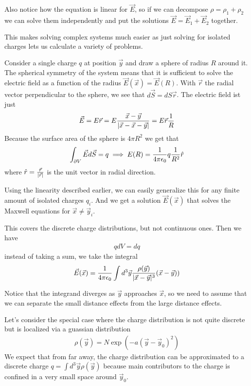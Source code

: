 Also notice how the equation is linear for $\vec{E}$, so if we can decompose $\rho = \rho_1 + \rho_2$ we can solve them independently and put the solutions $\vec{E} = \vec{E}_1 + \vec{E}_2$ together.

This makes solving complex systems much easier as just solving for isolated charges lets us calculate a variety of problems.

Consider a single charge $q$ at position $\vec{y}$ and draw a sphere of radius $R$ around it. The spherical symmetry of the system means that it is sufficient to solve the electric field as a function of the radius $\vec{E}(\vec{x}) = \vec{E}(R)$.
With $\vec{r}$ the radial vector perpendicular to the sphere, we see that $d \vec{S}= d S \vec{r}$. 
The electric field ist just
\begin{align*}
  \vec{E} = E \vec{r} = E \frac{\vec{x} - \vec{y}}{\vert\vec{x} - \vec{x} - \vec{y}\vert} = E \vec{r} \frac{1}{R}
\end{align*}
Because the surface area of the sphere is $4 \pi R^{2}$ we get that
\begin{align*}
  \int_{\partial V}\vec{E} d \vec{S} = q \implies E(R) = \frac{1}{4 \pi \epsilon_0} q \frac{1}{R^{2}} \hat{r}
\end{align*}
where $\hat{r} = \frac{\vec{r}}{\vert\vec{r}\vert}$ is the unit vector in radial direction.

Using the linearity described earlier, we can easily generalize this for any finite amount of isolated charges $q_i$.
And we get a solution $\vec{E}(\vec{x})$ that solves the Maxwell equations for $\vec{x} \neq \vec{y}_i$.

This covers the discrete charge distributions, but not continuous ones. Then we have
\begin{align*}
  q dV = dq
\end{align*}
instead of taking a sum, we take the integral
\begin{align*}
  \vec{E}(\vec{x}) = \frac{1}{4 \pi \epsilon_0} \int d^{3}\vec{y} \frac{\rho(\vec{y})}{\vert\vec{x} - \vec{y}\vert^{3}} (\vec{x} - \vec{y}))
\end{align*}

Notice that the integrand diverges as $\vec{y}$ approaches $\vec{x}$, so we need to assume that we can separate the small distance effects from the large distance effects.

Let's consider the special case where the charge distribution is not quite discrete but is localized via a guassian distribution
\begin{align*}
  \rho(\vec{y}) =N \exp\left(
    - a (\vec{y} - \vec{y}_0)^2
  \right)
\end{align*}
We expect that from far away, the charge distribution can be approximated to a discrete charge $q = \int d^{3}\vec{y} \rho(\vec{y})$
because main contributors to the charge is confined in a very small space around $\vec{y}_0$.


